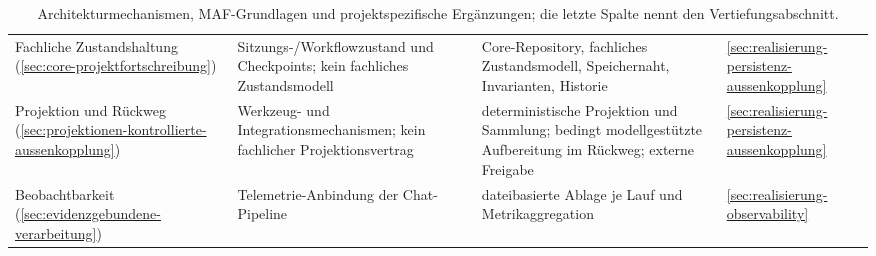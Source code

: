 \begin{table}[!htb]
\begin{tabular}{p{}p{}p{}p{}}
    Fachliche Zustandshaltung (\ref{sec:core-projektfortschreibung}) &
    Sitzungs-/Workflowzustand und Checkpoints; kein fachliches
    Zustandsmodell &
    Core-Repository, fachliches Zustandsmodell, Speichernaht,
    Invarianten, Historie & \ref{sec:realisierung-persistenz-aussenkopplung} \\
    Projektion und Rückweg (\ref{sec:projektionen-kontrollierte-aussenkopplung}) &
    Werkzeug- und Integrationsmechanismen; kein fachlicher
    Projektionsvertrag &
    deterministische Projektion und Sammlung; bedingt
    modellgestützte Aufbereitung im Rückweg; externe Freigabe & \ref{sec:realisierung-persistenz-aussenkopplung} \\
    Beobachtbarkeit (\ref{sec:evidenzgebundene-verarbeitung}) &
    Telemetrie-Anbindung der Chat-Pipeline &
    dateibasierte Ablage je Lauf und Metrikaggregation & \ref{sec:realisierung-observability} \\
    \hline
  \end{tabular}
  \caption[MAF-Grundlagen und projektspezifische Ergänzungen]{
    Architekturmechanismen, MAF-Grundlagen und projektspezifische
    Ergänzungen; die letzte Spalte nennt den Vertiefungsabschnitt.}
  \label{t:maf-zuordnung}
\end{table}
